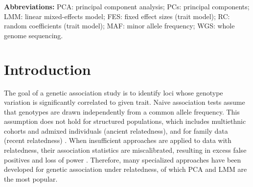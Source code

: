 \documentclass[11pt]{article}
\begin{document}
\begin{linenumbers}
\textbf{Abbreviations:}
PCA: principal component analysis;
PCs: principal components;
LMM: linear mixed-effects model;
FES: fixed effect sizes (trait model);
RC: random coefficients (trait model);
MAF: minor allele frequency;
WGS: whole genome sequencing.

\section{Introduction} 

The goal of a genetic association study is to identify loci whose genotype variation is significantly correlated to given trait.
Naive association tests assume that genotypes are drawn independently from a common allele frequency.
This assumption does not hold for structured populations, which includes multiethnic cohorts and admixed individuals (ancient relatedness), and for family data (recent relatedness) \citep{astle_population_2009}.
When insufficient approaches are applied to data with relatedness, their association statistics are miscalibrated, resulting in excess false positives and loss of power \citep{devlin_genomic_1999, voight_confounding_2005, astle_population_2009}.
Therefore, many specialized approaches have been developed for genetic association under relatedness, of which PCA and LMM are the most popular.


\end{linenumbers}
\end{document}

